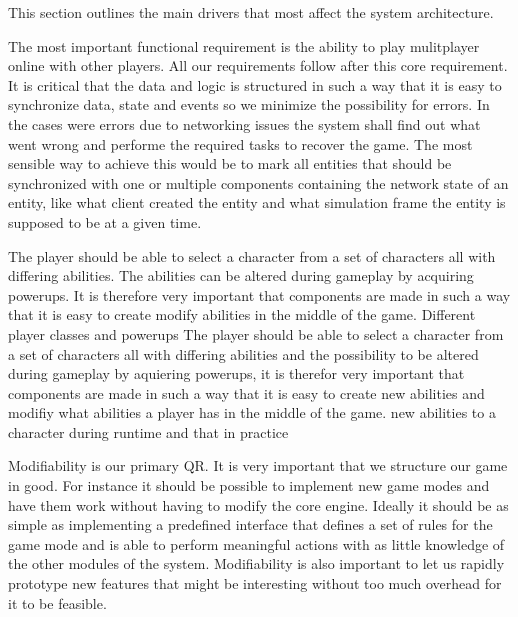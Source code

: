 	This section outlines the main drivers that most affect the system architecture.

	The most important functional requirement is the ability to play mulitplayer online with other	
	players. All our requirements follow after this core requirement. It is critical that the data and logic is 
	structured in such a way that it is easy to synchronize data, state and events so we minimize the possibility for errors. 
	In the cases were errors due to networking issues the system shall find out what went wrong and performe the required tasks to recover the game. 
	The most sensible way to achieve this would be to mark all entities 	
	that should be synchronized with one or multiple components containing the network state of an entity, like what client created the entity and what simulation frame the entity is supposed to be at a given time.

	The player should be able to select a character from a set of characters all with differing abilities. The abilities can be altered during gameplay by acquiring powerups. It is therefore very important that components are made in such a way that it is easy to create modify abilities in the middle of the game.
	Different player classes and powerups
	The player should be able to select a character from a set of characters all with differing abilities and the possibility to be altered during gameplay
	by aquiering powerups, it is therefor very important that components are made in such a way that it is easy to create new abilities and modifiy
	what abilities a player has in the middle of the game. new abilities to a character during runtime and that in practice 


	Modifiability is our primary QR. It is very important that we structure our game in good. For instance it should be possible to implement new game modes and have them work without having to modify the core engine. Ideally it should be as simple as implementing a predefined interface that defines a set of rules for the game mode and is able to perform meaningful actions with as little knowledge of the other modules of the system. Modifiability is also important to let us rapidly prototype new features that might be interesting without too much overhead for it to be feasible.

